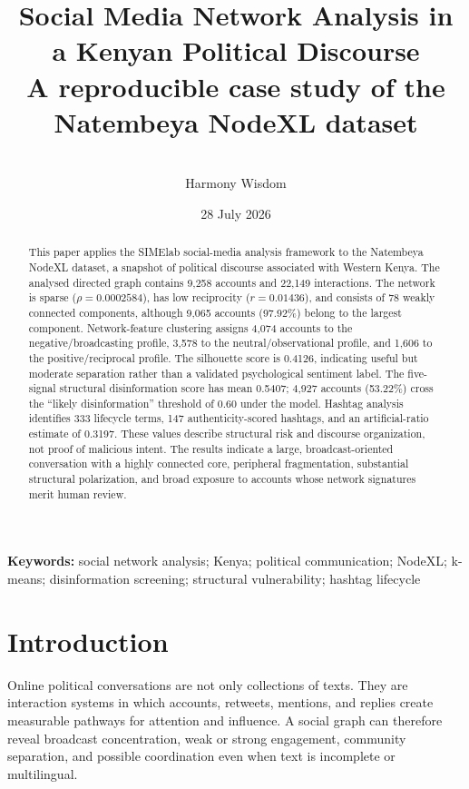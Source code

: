 \documentclass[11pt]{article}
\title{\textbf{Social Media Network Analysis in a Kenyan Political Discourse}\vspace{3pt}\\
\large A reproducible case study of the Natembeya NodeXL dataset}
\author{\SIMElab\\ Harmony Wisdom}
\date{28 July 2026}
\begin{document}
\maketitle

\begin{abstract}
This paper applies the SIMElab social-media analysis framework to the Natembeya NodeXL dataset, a snapshot of political discourse associated with Western Kenya. The analysed directed graph contains 9,258 accounts and 22,149 interactions. The network is sparse ($\rho=0.0002584$), has low reciprocity ($r=0.01436$), and consists of 78 weakly connected components, although 9,065 accounts (97.92\%) belong to the largest component. Network-feature clustering assigns 4,074 accounts to the negative/broadcasting profile, 3,578 to the neutral/observational profile, and 1,606 to the positive/reciprocal profile. The silhouette score is 0.4126, indicating useful but moderate separation rather than a validated psychological sentiment label. The five-signal structural disinformation score has mean 0.5407; 4,927 accounts (53.22\%) cross the ``likely disinformation'' threshold of 0.60 under the model. Hashtag analysis identifies 333 lifecycle terms, 147 authenticity-scored hashtags, and an artificial-ratio estimate of 0.3197. These values describe structural risk and discourse organization, not proof of malicious intent. The results indicate a large, broadcast-oriented conversation with a highly connected core, peripheral fragmentation, substantial structural polarization, and broad exposure to accounts whose network signatures merit human review.
\end{abstract}

\textbf{Keywords:} social network analysis; Kenya; political communication; NodeXL; k-means; disinformation screening; structural vulnerability; hashtag lifecycle

\tableofcontents
\newpage

\section{Introduction}

Online political conversations are not only collections of texts. They are interaction systems in which accounts, retweets, mentions, and replies create measurable pathways for attention and influence. A social graph can therefore reveal broadcast concentration, weak or strong engagement, community separation, and possible coordination even when text is incomplete or multilingual.
\end{document}
